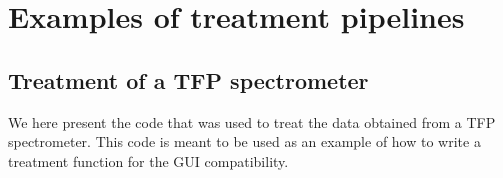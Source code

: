 \documentclass[a4paper,12pt]{article}
\begin{document}
\section{Examples of treatment pipelines}

    \subsection{Treatment of a TFP spectrometer} \label{subsec:example_treatment.TFP}

        \begin{tcolorbox}
            We here present the code that was used to treat the data obtained from a TFP spectrometer. This code is meant to be used as an example of how to write a treatment function for the GUI compatibility. 
        \end{tcolorbox}
\end{document}
